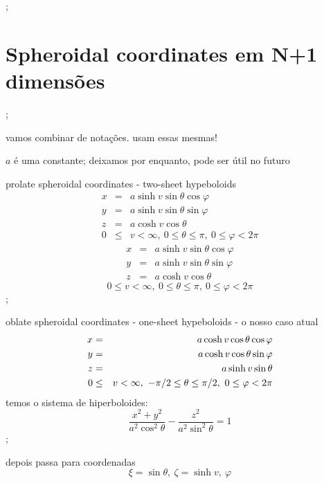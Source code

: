 \documentclass[a4paper,12pt]{article}
\begin{document}
;

\section{Spheroidal coordinates em N+1 dimens\~{o}es}

;

vamos combinar de nota\c{c}\~{o}es. usam essas mesmas!

$a$ \'{e} uma constante; deixamos por enquanto, pode ser \'{u}til no futuro

prolate spheroidal coordinates - two-sheet hypeboloids%
\begin{eqnarray*}
x &=&a\sinh v\sin \theta \cos \varphi  \\
y &=&a\sinh v\sin \theta \sin \varphi  \\
z &=&a\cosh v\cos \theta  \\
0 &\leq &v<\infty ,\ 0\leq \theta \leq \pi ,\ 0\leq \varphi <2\pi 
\end{eqnarray*}%
\begin{eqnarray*}
x &=&a\sinh v\sin \theta \cos \varphi  \\
y &=&a\sinh v\sin \theta \sin \varphi  \\
z &=&a\cosh v\cos \theta 
\end{eqnarray*}%
\begin{equation*}
0\leq v<\infty ,\ 0\leq \theta \leq \pi ,\ 0\leq \varphi <2\pi 
\end{equation*}%
;

oblate spheroidal coordinates - one-sheet hypeboloids - o nosso caso atual%
\begin{eqnarray}
x &=&a\cosh v\cos \theta \cos \varphi   \label{00-osc} \\
y &=&a\cosh v\cos \theta \sin \varphi   \notag \\
z &=&a\sinh v\sin \theta   \notag \\
0 &\leq &v<\infty ,\ -\pi /2\leq \theta \leq \pi /2,\ 0\leq \varphi <2\pi  
\notag
\end{eqnarray}%
temos o sistema de hiperboloides:%
\begin{equation*}
\frac{x^{2}+y^{2}}{a^{2}\cos ^{2}\theta }-\frac{z^{2}}{a^{2}\sin ^{2}\theta }%
=1
\end{equation*}%
;

depois passa para coordenadas%
\begin{equation*}
\xi =\sin \theta ,\ \zeta =\sinh v,\ \varphi
\end{equation*}%
$\frac{{}}{{}}$
\end{document}
